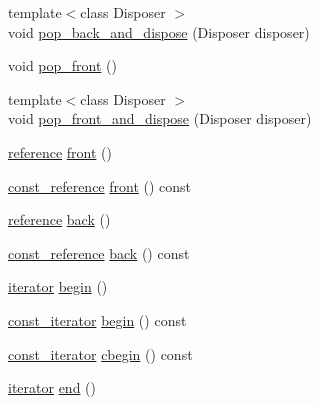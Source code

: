 \begin{DoxyCompactItemize}
{\footnotesize template$<$class Disposer $>$ }\\void \hyperlink{classboost_1_1intrusive_1_1list__impl_ad2f45b6fd9f4d189e9f5c6fc126334b8}{pop\+\_\+back\+\_\+and\+\_\+dispose} (Disposer disposer)
\item 
void \hyperlink{classboost_1_1intrusive_1_1list__impl_aa0a3b2545ff925b8f3185ab5f4027d4e}{pop\+\_\+front} ()
\item 
{\footnotesize template$<$class Disposer $>$ }\\void \hyperlink{classboost_1_1intrusive_1_1list__impl_ab1d06a67a6e0f958b0f3afd61d2af8d5}{pop\+\_\+front\+\_\+and\+\_\+dispose} (Disposer disposer)
\item 
\hyperlink{classboost_1_1intrusive_1_1list__impl_a881763b587dbe7c0237a552a9e89755a}{reference} \hyperlink{classboost_1_1intrusive_1_1list__impl_adfff2fc56d86000cced59427fecf0e90}{front} ()
\item 
\hyperlink{classboost_1_1intrusive_1_1list__impl_a3d37629151c76fb8389ac3ba3b359201}{const\+\_\+reference} \hyperlink{classboost_1_1intrusive_1_1list__impl_a51eb323fe6d3cc6c590886a7514dbb27}{front} () const
\item 
\hyperlink{classboost_1_1intrusive_1_1list__impl_a881763b587dbe7c0237a552a9e89755a}{reference} \hyperlink{classboost_1_1intrusive_1_1list__impl_a257758f8527be08329dbc14ca5527fd8}{back} ()
\item 
\hyperlink{classboost_1_1intrusive_1_1list__impl_a3d37629151c76fb8389ac3ba3b359201}{const\+\_\+reference} \hyperlink{classboost_1_1intrusive_1_1list__impl_a92fa54fafbdf353a6b51c145c775d215}{back} () const
\item 
\hyperlink{classboost_1_1intrusive_1_1list__impl_a15c0189bf62eb9fb98bc07ef10b8cb23}{iterator} \hyperlink{classboost_1_1intrusive_1_1list__impl_acc6da960285b2ff0f37e1f373a767e19}{begin} ()
\item 
\hyperlink{classboost_1_1intrusive_1_1list__impl_af4ced710fe02662c5650d161af83d8cd}{const\+\_\+iterator} \hyperlink{classboost_1_1intrusive_1_1list__impl_a049277a05485ff97f95ff4d778c5551d}{begin} () const
\item 
\hyperlink{classboost_1_1intrusive_1_1list__impl_af4ced710fe02662c5650d161af83d8cd}{const\+\_\+iterator} \hyperlink{classboost_1_1intrusive_1_1list__impl_adc17ab4f4ca5c3817adf62960dec3d40}{cbegin} () const
\item 
\hyperlink{classboost_1_1intrusive_1_1list__impl_a15c0189bf62eb9fb98bc07ef10b8cb23}{iterator} \hyperlink{classboost_1_1intrusive_1_1list__impl_af2a454471fced6d4b2fb899c50bbee67}{end} ()

\end{DoxyCompactItemize}
